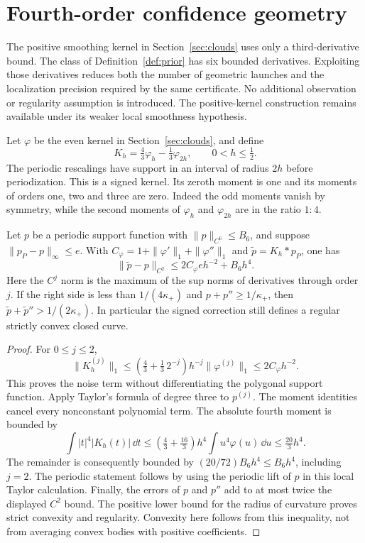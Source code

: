 \section{Fourth-order confidence geometry}
\label{sec:compensated}
The positive smoothing kernel in Section~\ref{sec:clouds} uses only a
third-derivative bound. The class of Definition~\ref{def:prior} has six
bounded derivatives. Exploiting those derivatives reduces both the number
of geometric launches and the localization precision required by the
same certificate. No additional observation or regularity assumption is
introduced. The positive-kernel construction remains available under its
weaker local smoothness hypothesis.

Let $\varphi$ be the even kernel in Section~\ref{sec:clouds}, and define
\begin{equation}\label{eq:comp-kernel}
 K_h=\tfrac43\varphi_h-\tfrac13\varphi_{2h},\qquad 0<h\le\tfrac12.
\end{equation}
The periodic rescalings have support in an interval of radius $2h$ before
periodization. This is a signed kernel. Its zeroth moment is one and its
moments of orders one, two and three are zero. Indeed the odd moments
vanish by symmetry, while the second moments of $\varphi_h$ and
$\varphi_{2h}$ are in the ratio $1:4$.

\begin{lemma}\label{lem:comp-smoothing}
Let $p$ be a periodic support function with $\|p\|_{C^6}\le B_6$, and
suppose $\|p_P-p\|_\infty\le e$. With
$C_\varphi=1+\|\varphi'\|_1+\|\varphi''\|_1$ and
$\widetilde p=K_h*p_P$, one has
\begin{equation}\label{eq:comp-bound}
 \|\widetilde p-p\|_{C^2}
       \le 2C_\varphi e h^{-2}+B_6h^4.
\end{equation}
Here the $C^j$ norm is the maximum of the sup norms of derivatives
through order $j$. If the right side is less than $1/(4\kappa_+)$
and $p+p''\ge1/\kappa_+$, then
$\widetilde p+\widetilde p''>1/(2\kappa_+)$. In particular the
signed correction still defines a regular strictly convex closed curve.
\end{lemma}
\begin{proof}
For $0\le j\le2$,
\[
 \|K_h^{(j)}\|_1\le
 \left(\tfrac43+\tfrac13\,2^{-j}\right)
       h^{-j}\|\varphi^{(j)}\|_1\le 2C_\varphi h^{-2}.
\]
This proves the noise term without differentiating the polygonal support
function. Apply Taylor's formula of degree three to $p^{(j)}$.
The moment identities cancel every nonconstant polynomial term. The
absolute fourth moment is bounded by
\[
 \int |t|^4|K_h(t)|\,\dd t
 \le \left(\tfrac43+\tfrac{16}3\right)h^4
                            \int u^4\varphi(u)\,\dd u
 \le \tfrac{20}3h^4.
\]
The remainder is consequently bounded by
$(20/72)B_6h^4\le B_6h^4$, including $j=2$.
The periodic statement follows by using the periodic lift of $p$ in
this local Taylor calculation. Finally, the errors of $p$ and $p''$
add to at most twice the displayed $C^2$ bound. The positive lower bound
for the radius of curvature proves strict convexity and regularity.
Convexity here follows from this inequality, not from averaging convex
bodies with positive coefficients.
\end{proof}

